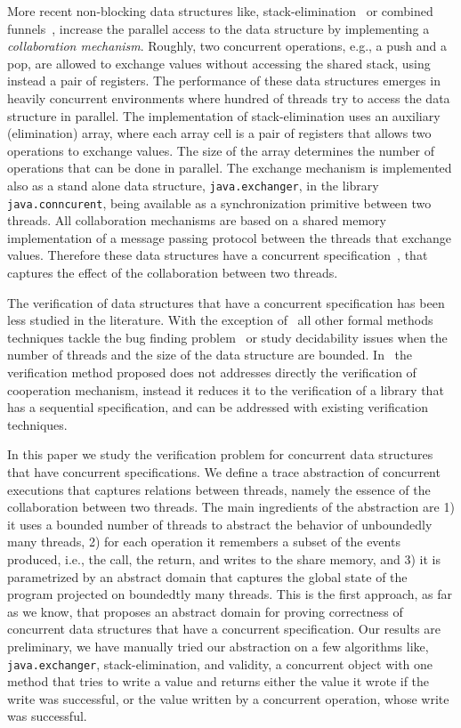 More recent non-blocking data structures like, stack-elimination~\cite{} or combined funnels~\cite{}, increase the parallel access to the data structure by implementing a {\em collaboration mechanism}. Roughly, two concurrent operations, e.g., a push and a pop, are allowed to exchange values without accessing the shared stack, using instead a pair of registers. The performance of these data structures emerges in heavily concurrent environments  where hundred of threads try to access the data structure in parallel. The implementation  of stack-elimination uses an auxiliary (elimination) array, where each array cell is a pair of registers that allows two operations to exchange values. The size of the array determines the number of operations that can be done in parallel.  
The exchange mechanism is implemented also as a stand alone data structure, \texttt{java.exchanger}, in the library \texttt{java.conncurent}, being available as a synchronization primitive between two threads. 
All collaboration mechanisms are based on a shared memory implementation of a message passing protocol between the threads that exchange values. 
Therefore these data structures have a concurrent specification~\cite{disc15}, that captures the effect of the collaboration between two threads. 

The verification of data structures that have a concurrent specification has been less studied in the literature. With the exception of~\cite{cav13} all other formal methods techniques tackle the bug finding problem~\cite{EneaEmmie1,EneaEmmie2} or study decidability issues when the number of threads and the size of the data structure are bounded. In~\cite{cav13} the verification method proposed does not addresses directly the verification of cooperation mechanism, instead it reduces it to the verification of a library that has a sequential specification, and can be addressed with existing verification techniques. 



In this paper we study the verification problem for concurrent data structures that have concurrent specifications. We define a trace abstraction of concurrent executions that captures relations between threads, namely the essence of the collaboration between two threads. 
The main ingredients of the abstraction are 1) it uses a bounded number of threads to abstract the behavior of unboundedly many  threads,  2) for each operation it remembers a subset of the events produced, i.e., the call, the return, and writes to the share memory, and 
 3) it is parametrized by an abstract domain that captures the global state of the program projected on boundedtly many threads. 
This is the first approach, as far as we know, that proposes an abstract domain for proving correctness of concurrent data structures that have a concurrent specification.  Our results are preliminary, we have manually tried our abstraction on a few algorithms like, \texttt{java.exchanger}, stack-elimination, and validity, a concurrent object with one method that tries to write a value and returns either the value it wrote if the write was successful, or the value written by a concurrent operation, whose write was successful.   
 
